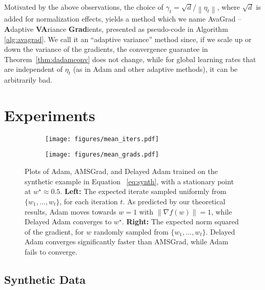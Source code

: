 \documentclass{article}
\newcommand{\norm}[1]{\left\lVert{#1}\right\rVert}
\newcommand{\thmref}[1]{Theorem~\ref{#1}}
\newcommand{\w}{w}
\newcommand{\curre}{\eta_t}
\newcommand{\normed}[1]{\left\lVert {#1} \right\rVert}
\begin{document}
Motivated by the above observations, the choice of $\gamma_t = \sqrt d / \norm{\curre}$, where $\sqrt d$ is added for normalization effects, yields a method which we name AvaGrad --
\textbf{A}daptive \textbf{VA}riance \textbf{Grad}ients, presented as
pseudo-code in Algorithm \ref{alg:avagrad}.  We call it an
``adaptive variance'' method since, if we scale up or down the variance of the
gradients, the convergence guarantee in
\thmref{thm:dadamconv} does not change, while for global learning rates that are independent of $\curre$ (as in Adam and other adaptive methods), it can be arbitrarily bad.
 \section{Experiments}
\label{sec:exp}

\begin{figure*}[!bt]
   \centering
   \begin{subfigure}{.5\textwidth}
      \centering
      \texttt{[image: figures/mean\_iters.pdf]}
   \end{subfigure}\hfill
   \begin{subfigure}{.5\textwidth}
      \centering
      \texttt{[image: figures/mean\_grads.pdf]}
   \end{subfigure}
   \caption{
      Plots of Adam, AMSGrad, and Delayed Adam trained on the synthetic
      example in Equation ~\ref{eq:synth}, with a stationary point at
      $w^\star \approx 0.5$.
      \textbf{Left:}
         The expected iterate sampled uniformly from $\{\w_1, \dots, \w_t\}$,
         for each iteration $t$. As predicted by our theoretical results, Adam
         moves towards $\w=1$ with $\normed{\nabla f(\w)} = 1$, while Delayed
         Adam converges to $\w^\star$.
      \textbf{Right:}
         The expected norm squared of the gradient, for $\w$ randomly sampled
         from $\{w_1, \dots, \w_t\}$.  Delayed Adam converges significantly
         faster than AMSGrad, while Adam fails to converge.
   }
   \label{fig:synth}
\end{figure*}
 
\subsection{Synthetic Data}
\end{document}
